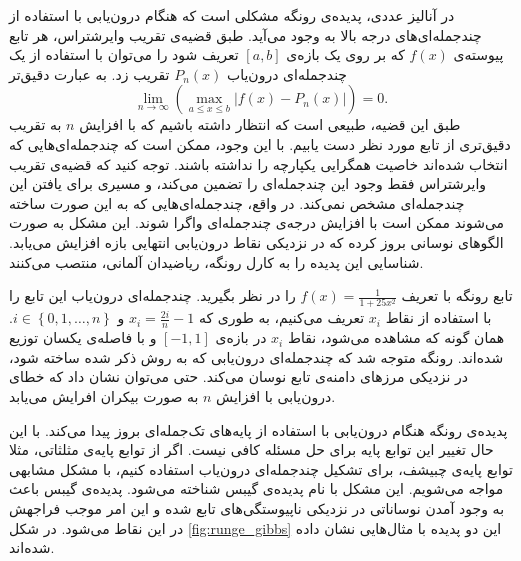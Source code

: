 \documentclass[12pt,onecolumn,a4paper]{article}
\begin{document}
در آنالیز عددی، پدیده‌ی رونگه مشکلی است که هنگام درون‌یابی با استفاده از چندجمله‌ای‌های درجه بالا به وجود می‌آید. طبق قضیه‌ی تقریب وایرشتراس،
هر تابع پیوسته‌ی 
$f(x)$
که بر روی یک بازه‌ی
$[a,b]$
تعریف شود را می‌توان با استفاده از یک چندجمله‌ای درون‌یاب
$P_n(x)$
تقریب زد. به عبارت دقیق‌تر
\begin{equation*}
    \lim_{n\rightarrow \infty}\left(\max _{{a\leq x\leq b}}\left|f(x)-P_{n}(x)\right|\right)=0.
\end{equation*}
طبق این قضیه، طبیعی است که انتظار داشته باشیم که با افزایش 
$n$
به تقریب دقیق‌تری از تابع مورد نظر دست یابیم. با این وجود، ممکن است که چندجمله‌ای‌هایی که انتخاب شده‌اند خاصیت همگرایی یکپارچه را نداشته باشند. توجه کنید که قضیه‌ی تقریب وایرشتراس فقط وجود این چندجمله‌ای را تضمین می‌کند، و مسیری برای یافتن این چندجمله‌ای مشخص نمی‌کند. در واقع، چندجمله‌ای‌هایی که به این صورت ساخته می‌شوند ممکن است با افزایش درجه‌ی چندجمله‌ای واگرا شوند. این مشکل به صورت الگوهای نوسانی بروز کرده که در نزدیکی نقاط درون‌یابی انتهایی بازه افزایش می‌یابد. شناسایی این پدیده را به  کارل رونگه،
ریاضیدان آلمانی، منتصب می‌کنند.

تابع رونگه با تعریف 
$f(x)=\frac{1}{1+25x^2}$ 
را در نظر بگیرید. چندجمله‌ای درون‌یاب این تابع را با استفاده از نقاط 
$x_i$ 
تعریف می‌کنیم، به طوری که
$x_{i}=\frac{2i}{n}-1$ 
و 
$i\in \left\{0,1,\dots ,n\right\}$.
همان گونه که مشاهده می‌شود، نقاط 
$x_i$ 
در بازه‌ی 
$[-1,1]$ 
و با فاصله‌ی یکسان توزیع شده‌اند. رونگه متوجه شد که چندجمله‌ای درون‌یابی که به روش ذکر شده ساخته شود، در نزدیکی مرز‌های دامنه‌ی تابع نوسان می‌کند. حتی می‌توان نشان داد که خطای درون‌یابی با افزایش 
$n$ 
 به صورت بیکران افرایش می‌یابد.

پدیده‌ی رونگه هنگام درون‌یابی با استفاده از پایه‌های تک‌جمله‌ای 
بروز پیدا می‌کند. با این حال تغییر این توابع پایه برای حل مسئله کافی نیست. اگر از توابع پایه‌ی مثلثاتی، مثلا توابع پایه‌ی چبیشف، برای تشکیل چندجمله‌ای درون‌یاب استفاده کنیم، با مشکل مشابهی مواجه می‌شویم. این مشکل  با نام پدیده‌ی گیبس
شناخته می‌شود. پدیده‌ی گیبس باعث به وجود آمدن نوساناتی در نزدیکی ناپیوستگی‌های تابع شده و این امر موجب فراجهش
در این نقاط می‌شود. در شکل 
\ref{fig:runge_gibbs} 
این دو پدیده با مثال‌هایی نشان داده‌ شده‌اند.
\end{document}

